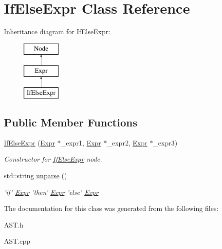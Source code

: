 \hypertarget{classIfElseExpr}{\section{If\-Else\-Expr Class Reference}
\label{classIfElseExpr}
}
Inheritance diagram for If\-Else\-Expr\-:\begin{figure}[H]
\begin{center}
\leavevmode
\includegraphics[height=3.000000cm]{classIfElseExpr}
\end{center}
\end{figure}
\subsection*{Public Member Functions}
\begin{DoxyCompactItemize}
\item 
\hypertarget{classIfElseExpr_a3f58094bc399d9005e1e18a2bf9447cb}{\hyperlink{classIfElseExpr_a3f58094bc399d9005e1e18a2bf9447cb}{If\-Else\-Expr} (\hyperlink{classExpr}{Expr} $\ast$\-\_\-expr1, \hyperlink{classExpr}{Expr} $\ast$\-\_\-expr2, \hyperlink{classExpr}{Expr} $\ast$\-\_\-expr3)}\label{classIfElseExpr_a3f58094bc399d9005e1e18a2bf9447cb}

\begin{DoxyCompactList}\small\item\em Constructor for \hyperlink{classIfElseExpr}{If\-Else\-Expr} node. \end{DoxyCompactList}\item 
\hypertarget{classIfElseExpr_a27fe67b8603744cdeba824b706f898fa}{std\-::string \hyperlink{classIfElseExpr_a27fe67b8603744cdeba824b706f898fa}{unparse} ()}\label{classIfElseExpr_a27fe67b8603744cdeba824b706f898fa}

\begin{DoxyCompactList}\small\item\em 'if' \hyperlink{classExpr}{Expr} 'then' \hyperlink{classExpr}{Expr} 'else' \hyperlink{classExpr}{Expr} \end{DoxyCompactList}\end{DoxyCompactItemize}


The documentation for this class was generated from the following files\-:\begin{DoxyCompactItemize}
\item 
A\-S\-T.\-h\item 
A\-S\-T.\-cpp\end{DoxyCompactItemize}
